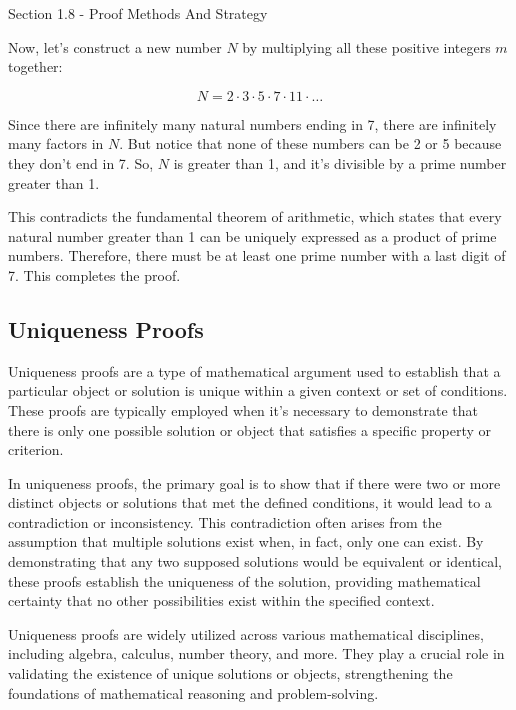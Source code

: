 \begin{notes}{Section 1.8 - Proof Methods And Strategy}
\begin{Highlight}
        Now, let's construct a new number \(N\) by multiplying all these positive integers \(m\) together:
        
        \[N = 2 \cdot 3 \cdot 5 \cdot 7 \cdot 11 \cdot \ldots\]
    
    
        Since there are infinitely many natural numbers ending in 7, there are infinitely many factors in \(N\). But notice that none of these numbers can be 2 or 5 because they don't end in 7. So, \(N\) is greater than 
        1, and it's divisible by a prime number greater than 1. 
    
        This contradicts the fundamental theorem of arithmetic, which states that every natural number greater than 1 can be uniquely expressed as a product of prime numbers. Therefore, there must be at least one prime 
        number with a last digit of 7. This completes the proof.
    \end{Highlight}
    
    \subsection*{Uniqueness Proofs}

    Uniqueness proofs are a type of mathematical argument used to establish that a particular object or solution is unique within a given context or set of conditions. These proofs are typically employed when it's necessary 
    to demonstrate that there is only one possible solution or object that satisfies a specific property or criterion.

    In uniqueness proofs, the primary goal is to show that if there were two or more distinct objects or solutions that met the defined conditions, it would lead to a contradiction or inconsistency. This contradiction often 
    arises from the assumption that multiple solutions exist when, in fact, only one can exist. By demonstrating that any two supposed solutions would be equivalent or identical, these proofs establish the uniqueness of the 
    solution, providing mathematical certainty that no other possibilities exist within the specified context.

    Uniqueness proofs are widely utilized across various mathematical disciplines, including algebra, calculus, number theory, and more. They play a crucial role in validating the existence of unique solutions or objects, 
    strengthening the foundations of mathematical reasoning and problem-solving.


\end{notes}
